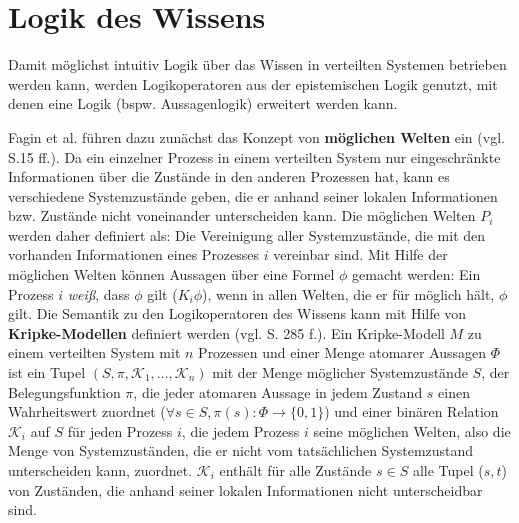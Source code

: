 \section{Logik des Wissens}
\label{Logik}
Damit möglichst intuitiv Logik über das Wissen in verteilten Systemen betrieben werden kann, werden Logikoperatoren aus der epistemischen Logik genutzt, mit denen eine Logik (bspw. Aussagenlogik) erweitert werden kann.

Fagin et al. führen dazu zunächst das Konzept von \textbf{möglichen Welten} ein (vgl. \cite{fagin2003reasoning} S.15 ff.). 
Da ein einzelner Prozess in einem verteilten System nur eingeschränkte Informationen über die Zustände in den anderen Prozessen hat, kann es verschiedene Systemzustände geben, die er anhand seiner lokalen Informationen bzw. Zustände nicht voneinander unterscheiden kann. Die möglichen Welten $P_i$ werden daher definiert als: Die Vereinigung aller Systemzustände, die mit den vorhanden Informationen eines Prozesses $i$ vereinbar sind.
Mit Hilfe der möglichen Welten können Aussagen über eine Formel $\phi$ gemacht werden:
Ein Prozess $i$ \textit{weiß}, dass $\phi$ gilt ($K_i\phi$), wenn in allen Welten, die er für möglich hält, $\phi$ gilt.
Die Semantik zu den Logikoperatoren des Wissens kann mit Hilfe von \textbf{Kripke-Modellen} definiert werden (vgl. \cite{kshemkalyani2011distributed} S. 285 f.).
Ein Kripke-Modell $M$ zu einem verteilten System mit $n$ Prozessen und einer Menge atomarer Aussagen $\Phi$ ist ein Tupel $(S,\pi,\mathcal{K}_1,...,\mathcal{K}_n)$ mit der Menge möglicher Systemzustände $S$, der Belegungsfunktion $\pi$, die jeder atomaren Aussage in jedem Zustand $s$ einen Wahrheitswert zuordnet ($\forall s\in S, \pi(s):\Phi \rightarrow \{0,1\}$) und einer binären Relation $\mathcal{K}_i$ auf $S$ für jeden Prozess $i$, die jedem Prozess $i$ seine möglichen Welten, also die Menge von Systemzuständen, die er nicht vom tatsächlichen Systemzustand unterscheiden kann, zuordnet. $\mathcal{K}_i$ enthält für alle Zustände $s \in S$ alle Tupel ($s,t$) von Zuständen, die anhand seiner lokalen Informationen nicht unterscheidbar sind. \medskip

